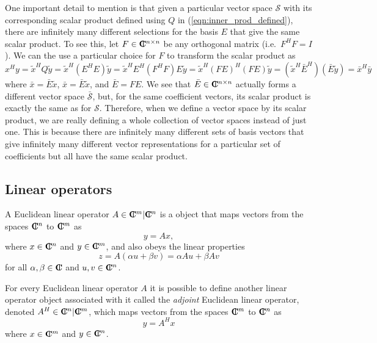 \documentclass[pdf,ps2pdf,11pt]{SANDreport}
\begin{document}
One important detail to mention is that given a particular vector space
$\mathcal{S}$ with its corresponding scalar product defined using $Q$ in
(\ref{eqn:inner_prod_defined}), there are infinitely many different selections
for the basis $E$ that give the same scalar product.  To see this, let
$F\in\mbox{\textbf{C}}\hspace{-1.1ex}\mbox{l}\hspace{0.4ex}^{n\times{}n}$ be any orthogonal matrix (i.e.\ $F^H F = I$).  We can
the use a particular choice for $F$ to transform the scalar product as
%
\begin{equation}
x^H y = \tilde{x}^H Q \tilde{y}
= \tilde{x}^H ( E^H E ) \tilde{y}
= \tilde{x}^H E^H ( F^H F ) E \tilde{y}
= \tilde{x}^H ( F E )^H ( F E ) \tilde{y}
= ( \tilde{x}^H \bar{E}^H ) ( \bar{E} \tilde{y} )
= \bar{x}^H \bar{y}
\label{eqn:inner_x_y_F_E_prod}
\end{equation}
%
where $\bar{x} = {}\bar{E} {}\tilde{x}$, $\bar{x} = {}\bar{E} {}\tilde{x}$,
and $\bar{E} = F E$.  We see that $\bar{E}\in\mbox{\textbf{C}}\hspace{-1.1ex}\mbox{l}\hspace{0.4ex}^{n\times{}n}$ actually
forms a different vector space $\bar{\mathcal{S}}$, but, for the same
coefficient vectors, its scalar product is exactly the same as for
$\mathcal{S}$.  Therefore, when we define a vector space by its scalar
product, we are really defining a whole collection of vector spaces instead of
just one.  This is because there are infinitely many different sets of basis
vectors that give infinitely many different vector representations for a
particular set of coefficients but all have the same scalar product.

\subsection{Linear operators}

A Euclidean linear operator $A\in\mbox{\textbf{C}}\hspace{-1.1ex}\mbox{l}\hspace{0.4ex}^m|\mbox{\textbf{C}}\hspace{-1.1ex}\mbox{l}\hspace{0.4ex}^n$ is a object that maps
vectors from the spaces $\mbox{\textbf{C}}\hspace{-1.1ex}\mbox{l}\hspace{0.4ex}^n$ to $\mbox{\textbf{C}}\hspace{-1.1ex}\mbox{l}\hspace{0.4ex}^m$ as
%
\begin{equation}
y = A x,
\label{eqn:fwd_op_apply}
\end{equation}
%
where $x\in\mbox{\textbf{C}}\hspace{-1.1ex}\mbox{l}\hspace{0.4ex}^n$ and $y\in\mbox{\textbf{C}}\hspace{-1.1ex}\mbox{l}\hspace{0.4ex}^m$, and also obeys the linear properties
%
\begin{equation}
z = A(\alpha u + \beta v) = \alpha A u + \beta A v
\label{eqn:linear_op_properties}
\end{equation}
%
for all $\alpha,\beta\in\mbox{\textbf{C}}\hspace{-1.1ex}\mbox{l}\hspace{0.4ex}$ and $u,v\in\mbox{\textbf{C}}\hspace{-1.1ex}\mbox{l}\hspace{0.4ex}^n$.

For every Euclidean linear operator $A$ it is possible to define another
linear operator object associated with it called the {}\textit{adjoint}
Euclidean linear operator, denoted $A^H\in\mbox{\textbf{C}}\hspace{-1.1ex}\mbox{l}\hspace{0.4ex}^n|\mbox{\textbf{C}}\hspace{-1.1ex}\mbox{l}\hspace{0.4ex}^m$, which maps vectors
from the spaces $\mbox{\textbf{C}}\hspace{-1.1ex}\mbox{l}\hspace{0.4ex}^m$ to $\mbox{\textbf{C}}\hspace{-1.1ex}\mbox{l}\hspace{0.4ex}^n$ as
%
\begin{equation}
y = A^H x
\label{eqn:adjoint_op_apply}
\end{equation}
%
where $x\in\mbox{\textbf{C}}\hspace{-1.1ex}\mbox{l}\hspace{0.4ex}^m$ and $y\in\mbox{\textbf{C}}\hspace{-1.1ex}\mbox{l}\hspace{0.4ex}^n$.
\end{document}
